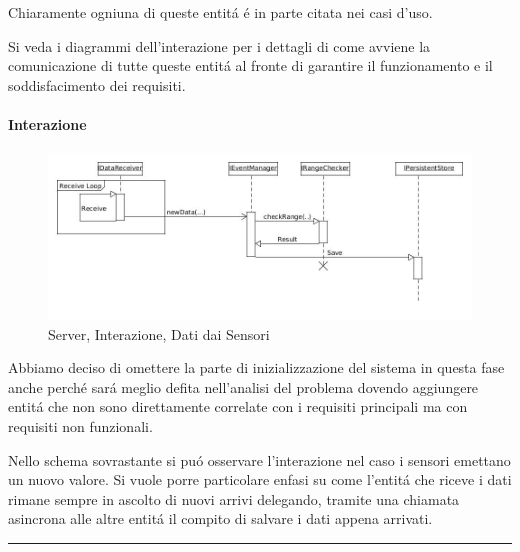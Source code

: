 Chiaramente ogniuna di queste entit\'a \'e in parte citata nei casi d'uso.

Si veda i diagrammi dell'interazione per i dettagli di come avviene la comunicazione di tutte queste entit\'a al fronte di garantire il funzionamento e il soddisfacimento dei requisiti.

\paragraph{Interazione}

\begin{figure}[h]
\centering
\includegraphics[width=\textwidth]{Figures/DomainModel/Server/NewDataInteraction}
\caption{Server, Interazione, Dati dai Sensori}
\end{figure}

Abbiamo deciso di omettere la parte di inizializzazione del sistema in questa fase anche perch\'e sar\'a meglio defita nell'analisi del problema dovendo aggiungere entit\'a che non sono direttamente correlate con i requisiti principali ma con requisiti non funzionali.

Nello schema sovrastante si pu\'o osservare l'interazione nel caso i sensori emettano un nuovo valore. Si vuole porre particolare enfasi su come l'entit\'a che riceve i dati rimane sempre in ascolto di nuovi arrivi delegando, tramite una chiamata asincrona alle altre entit\'a il compito di salvare i dati appena arrivati.

\noindent\rule[0.5ex]{\linewidth}{1pt}

